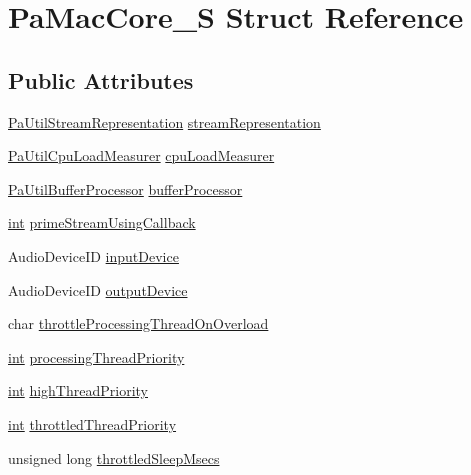 \hypertarget{struct_pa_mac_core___s}{}\section{Pa\+Mac\+Core\+\_\+S Struct Reference}
\label{struct_pa_mac_core___s}
\subsection*{Public Attributes}
\begin{DoxyCompactItemize}
\item 
\hyperlink{struct_pa_util_stream_representation}{Pa\+Util\+Stream\+Representation} \hyperlink{struct_pa_mac_core___s_a33b14f2443b74f82ff4404cda2576c26}{stream\+Representation}
\item 
\hyperlink{struct_pa_util_cpu_load_measurer}{Pa\+Util\+Cpu\+Load\+Measurer} \hyperlink{struct_pa_mac_core___s_a0f15c27d230448920776aed9d9a76ecd}{cpu\+Load\+Measurer}
\item 
\hyperlink{struct_pa_util_buffer_processor}{Pa\+Util\+Buffer\+Processor} \hyperlink{struct_pa_mac_core___s_a1e00da50807768b8b5e2bbc9aebd647f}{buffer\+Processor}
\item 
\hyperlink{xmltok_8h_a5a0d4a5641ce434f1d23533f2b2e6653}{int} \hyperlink{struct_pa_mac_core___s_a9550018299a5cae953fb6e4c5b5eaefd}{prime\+Stream\+Using\+Callback}
\item 
Audio\+Device\+ID \hyperlink{struct_pa_mac_core___s_abeb17a8d7442098c881ebc85d6b20df9}{input\+Device}
\item 
Audio\+Device\+ID \hyperlink{struct_pa_mac_core___s_a5e1d26bac1e0d45210b634fbbd5bb9f6}{output\+Device}
\item 
char \hyperlink{struct_pa_mac_core___s_a5929bd4e98ff26136a693b6435c697ba}{throttle\+Processing\+Thread\+On\+Overload}
\item 
\hyperlink{xmltok_8h_a5a0d4a5641ce434f1d23533f2b2e6653}{int} \hyperlink{struct_pa_mac_core___s_a188755e083fbfff87ad6bb57c08fbfe1}{processing\+Thread\+Priority}
\item 
\hyperlink{xmltok_8h_a5a0d4a5641ce434f1d23533f2b2e6653}{int} \hyperlink{struct_pa_mac_core___s_a50a18397874297facf9fe069ebec4091}{high\+Thread\+Priority}
\item 
\hyperlink{xmltok_8h_a5a0d4a5641ce434f1d23533f2b2e6653}{int} \hyperlink{struct_pa_mac_core___s_a4b601ed5926d694e987501f2663a3dbd}{throttled\+Thread\+Priority}
\item 
unsigned long \hyperlink{struct_pa_mac_core___s_a7ed3c3e0fc7065594886b8c437413aeb}{throttled\+Sleep\+Msecs}

\end{DoxyCompactItemize}
